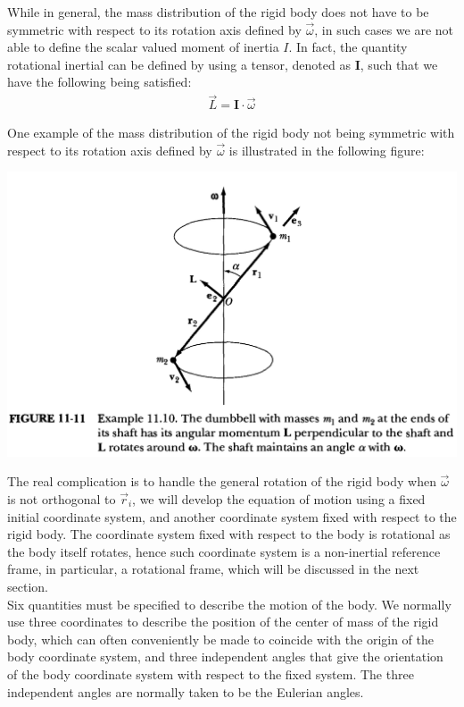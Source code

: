 \documentclass[11pt,oneside]{book}
\theoremstyle{break}
\theoremstyle{break}
\begin{document}
While in general, the mass distribution of the rigid body does not have to be symmetric with respect to its rotation axis defined by $\vec{\omega}$, in such cases we are not able to define the scalar valued moment of inertia $I$. In fact, the quantity rotational inertial can be defined by using a tensor, denoted as $\mathbf{I}$, such that we have the following being satisfied:
\begin{align*}
\vec{L} = \mathbf{I}\cdot \vec{\omega}
\end{align*}
\newpage

One example of the mass distribution of the rigid body not being symmetric with respect to its rotation axis defined by $\vec{\omega}$ is illustrated in the following figure:
\begin{center}
\includegraphics[scale=0.35]{shaft.png}
\end{center}

The real complication is to handle the general rotation of the rigid body when $\vec{\omega}$ is not orthogonal to $\vec{r}_i$, we will develop the equation of motion using a fixed initial coordinate system, and another coordinate system fixed with respect to the rigid body. The coordinate system fixed with respect to the body is rotational as the body itself rotates, hence such coordinate system is a non-inertial reference frame, in particular, a rotational frame, which will be discussed in the next section.\\

Six quantities must be specified to describe the motion of the body. We normally use three coordinates to describe the position of the center of mass of the rigid body, which can often conveniently be made to coincide with the origin of the body coordinate system, and three independent angles that give the orientation of the body coordinate system with respect to the fixed system. The three independent angles are normally taken to be the Eulerian angles.\\
\end{document}
